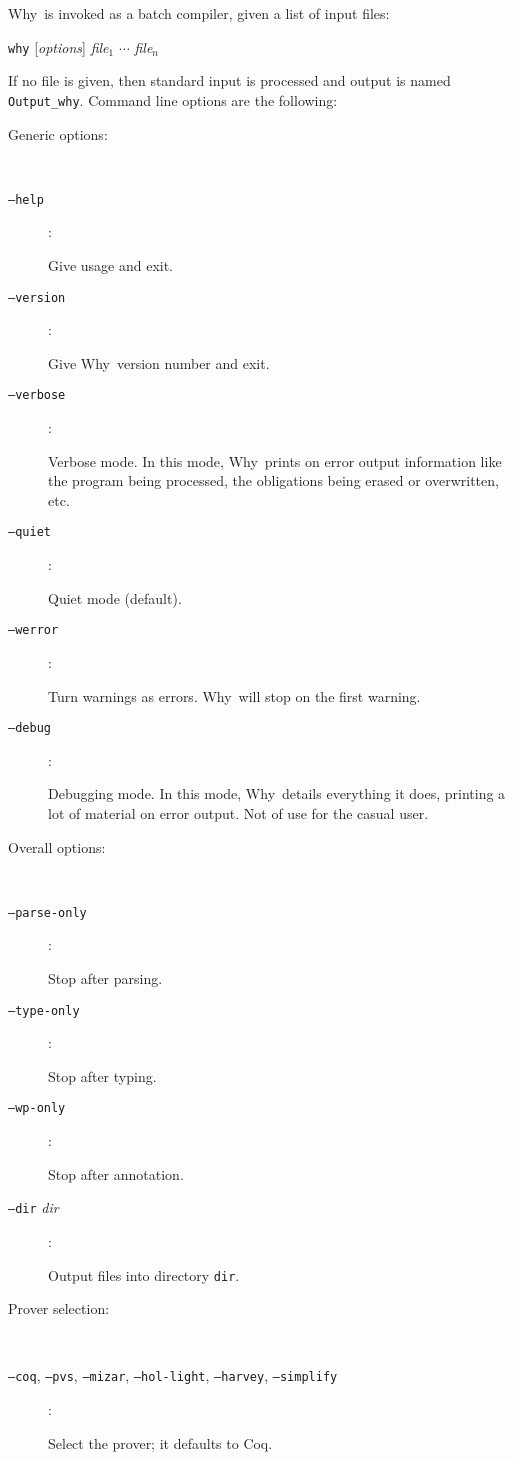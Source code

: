 \documentclass[a4paper,12pt]{report}
\makeatletter
\newcommand{\coq}{\textsf{Coq}\index{Coq@\textsf{Coq}}}
\newcommand{\why}{\textsf{Why}}
\makeatother
\begin{document}
\why\ is invoked as a batch compiler, given a list of input files:
\begin{center}
  \texttt{why} [\textit{options}] \textit{file}$_1$ $\cdots$ \textit{file}$_n$
\end{center}
If no file is given, then standard input is processed and output is
named \texttt{Output\_why}.
Command line options are the following:
\begin{description}
  \item[Generic options:] ~\par
  \item[\texttt{--help}]: ~\par    
    Give usage and exit. 
  \item[\texttt{--version}]: ~\par    
    Give \why\ version number and exit. 
  \item[\texttt{--verbose}]: ~\par 
    Verbose mode. In this mode, \why\ prints on error output
    information like the program being processed, the obligations
    being erased or overwritten, etc.
  \item[\texttt{--quiet}]: ~\par  
    Quiet mode (default).
  \item[\texttt{--werror}]: ~\par 
    Turn warnings as errors. \why\ will stop on the first warning.
  \item[\texttt{--debug}]: ~\par 
    Debugging mode. In this mode, \why\ details everything it does,
    printing a lot of material on error output. Not of use for the
    casual user.

  \item[Overall options:] ~\par
  \item[\texttt{--parse-only}]: ~\par  
    Stop after parsing.
  \item[\texttt{--type-only}]:  ~\par  
    Stop after typing.
  \item[\texttt{--wp-only}]:    ~\par  
    Stop after annotation.
  \item[\texttt{--dir} \textit{dir}]: ~\par
    Output files into directory \texttt{dir}.

  \item[Prover selection:] ~\par
  \item[\texttt{--coq}, \texttt{--pvs}, \texttt{--mizar}, 
        \texttt{--hol-light}, \texttt{--harvey}, \texttt{--simplify}]: ~\par 
    Select the prover; it defaults to \coq.


\end{description}
\end{document}
